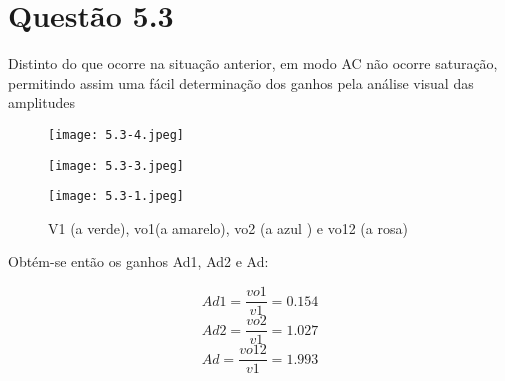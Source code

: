 \documentclass[a4paper,9pt]{extarticle}
\begin{document}
	 \section{Questão 5.3}
	 Distinto do que ocorre na situação anterior, em modo AC não ocorre saturação, permitindo assim uma fácil determinação dos ganhos pela análise visual das amplitudes \newline
	 \begin{figure}[H]
                                          \centering
                                          \begin{minipage}{0.45\textwidth}
                                                  \centering
                                                  \texttt{[image: 5.3-4.jpeg]} %
                                                \caption{}
                                          \end{minipage}\hfill
                                          \begin{minipage}{0.45\textwidth}
                                                  \centering
                                                  \texttt{[image: 5.3-3.jpeg]} %
                                               \caption{}
                                                  \end{minipage}
                                  \end{figure}
				 \begin{figure}[H]
                          \centering
                          \captionsetup{justification=centering}
                          \texttt{[image: 5.3-1.jpeg]}
                          \caption{V1 (a verde), vo1(a amarelo), vo2 (a azul ) e vo12 (a rosa)}
                  \end{figure}
		  Obtém-se então os ganhos Ad1, Ad2 e Ad:
\begin{center}
			    \begin{equation}
				    Ad1=\frac{vo1}{v1}=0.154
				\end{equation}
			\begin{equation}
			Ad2=\frac{vo2}{v1}=1.027
			\end{equation}
			\begin{equation}
			Ad=\frac{vo12}{v1}=1.993
			\end{equation}

		\end{center}
\end{document}
